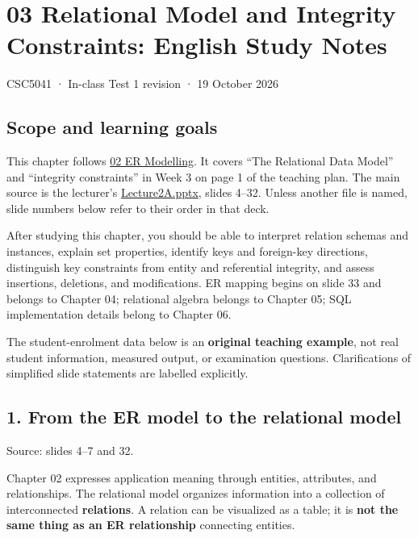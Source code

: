 \clearpage
\section{03 Relational Model and Integrity Constraints: English Study Notes}\label{03_relational_model_and_integrity_en}

CSC5041 · In-class Test 1 revision · 19 October 2026

\subsection{Scope and learning goals}\label{03_relational_model_and_integrity_en-scope-and-learning-goals}

This chapter follows \hyperref[02_er_modelling_en]{02 ER Modelling}. It covers ``The Relational Data Model'' and ``integrity constraints'' in Week 3 on page 1 of the teaching plan. The main source is the lecturer's \href{../../../slides/Lecture2A.pptx}{Lecture2A.pptx}, slides 4--32. Unless another file is named, slide numbers below refer to their order in that deck.

After studying this chapter, you should be able to interpret relation schemas and instances, explain set properties, identify keys and foreign-key directions, distinguish key constraints from entity and referential integrity, and assess insertions, deletions, and modifications. ER mapping begins on slide 33 and belongs to Chapter 04; relational algebra belongs to Chapter 05; SQL implementation details belong to Chapter 06.

The student-enrolment data below is an \textbf{original teaching example}, not real student information, measured output, or examination questions. Clarifications of simplified slide statements are labelled explicitly.

\subsection{1. From the ER model to the relational model}\label{03_relational_model_and_integrity_en-from-the-er-model-to-the-relational-model}

Source: slides 4--7 and 32.

Chapter 02 expresses application meaning through entities, attributes, and relationships. The relational model organizes information into a collection of interconnected \textbf{relations}. A relation can be visualized as a table; it is \textbf{not the same thing as an ER relationship} connecting entities.

